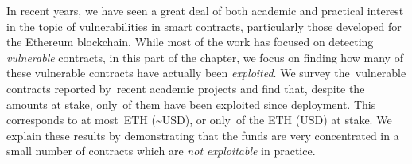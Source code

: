 In recent years, we have seen a great deal of both academic and practical interest in the topic of vulnerabilities in smart contracts, particularly those developed for the Ethereum blockchain.
While most of the work has focused on detecting \emph{vulnerable} contracts, in this part of the chapter, we focus on finding how many of these vulnerable contracts have actually been \emph{exploited}.
We survey the~\VulnerableContracts vulnerable contracts reported by~\PapersAnalyzed recent academic projects and find that, despite the amounts at stake, only~\PercentExploitedContracts of them have been exploited since deployment.
This corresponds to at most~\ExploitedEther ETH (\textasciitilde\ExploitedEtherUSD USD\footnotemark), or only~\PercentExploitedEther of the \EtherClaimedVulnerable ETH (\EtherClaimedVulnerableUSD USD) at stake.
We explain these results by demonstrating that the funds are very concentrated in a small number of contracts which are \emph{not exploitable} in practice.

